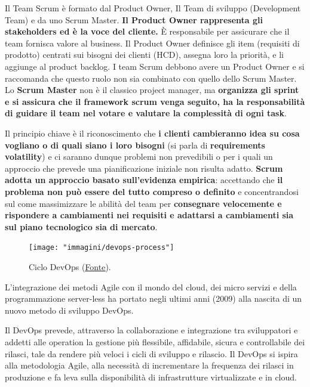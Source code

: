 Il Team Scrum è formato dal Product Owner, Il Team di sviluppo (Development Team) e da uno Scrum Master.
\textbf{Il Product Owner rappresenta gli stakeholders ed è la voce del cliente.} È responsabile per assicurare che il team fornisca valore al business.
Il Product Owner definisce gli item (requisiti di prodotto) centrati sui bisogni dei clienti (HCD), assegna loro la priorità, e li
aggiunge al product backlog. I team Scrum debbono avere un Product Owner e si raccomanda che questo ruolo non sia combinato con quello dello
Scrum Master.
Lo \textbf{Scrum Master} non è il classico project manager, ma \textbf{organizza gli sprint e si assicura che il framework scrum venga seguito, ha
la responsabilità di guidare il team nel votare e valutare la complessità di ogni task}.

Il principio chiave è il riconoscimento che \textbf{i clienti cambieranno idea su cosa vogliano o di quali siano i loro bisogni} (si parla di
\textbf{requirements volatility}) e ci saranno dunque problemi non prevedibili o per i quali un approccio che prevede una pianificazione iniziale
non risulta adatto. \textbf{Scrum adotta un approccio basato sull'evidenza empirica}: accettando che \textbf{il problema non può essere del tutto
compreso o definito} e concentrandosi sul come massimizzare le abilità del team per \textbf{consegnare velocemente e rispondere a cambiamenti nei
requisiti e adattarsi a cambiamenti sia sul piano tecnologico sia di mercato}.

\begin{figure}[h!]
	\centering
	\texttt{[image: "immagini/devops-process"]}
	\caption{Ciclo DevOps (\href{https://italiancoders.it/introduzione-al-devops/}{\underline{Fonte}}).}
\end{figure}

L'integrazione dei metodi Agile con il mondo del cloud, dei micro servizi e della programmazione server-less ha portato negli ultimi anni (2009)
alla nascita di un nuovo metodo di sviluppo DevOps.

Il DevOps prevede, attraverso la collaborazione e integrazione tra sviluppatori e addetti alle operation la gestione più flessibile, affidabile,
sicura e controllabile dei rilasci, tale da rendere più veloci i cicli di sviluppo e rilascio. Il DevOps si ispira alla metodologia Agile, alla
necessità di incrementare la frequenza dei rilasci in produzione e fa leva sulla disponibilità di infrastrutture virtualizzate e in cloud.

